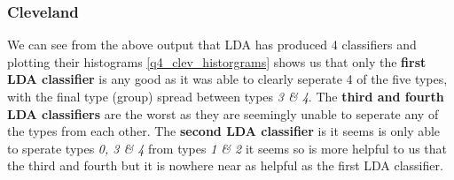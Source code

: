 \documentclass[a4paper]{article}
\begin{document}
\subsubsection{Cleveland}



We can see from the above output that LDA has produced 4 classifiers and
plotting their histograms \ref{q4_clev_historgrams} shows us that only the
\textbf{first LDA classifier} is any good as it was able to clearly seperate 4
of the five types, with the final type (group) spread between types \textit{3 \&
4}. The \textbf{third and fourth LDA classifiers} are the worst as they are
seemingly unable to seperate any of the types from each other. The
\textbf{second LDA classifier} is it seems is only able to sperate types
\textit{0, 3 \& 4} from types \textit{1 \& 2} it seems so is more helpful to us
that the third and fourth but it is nowhere near as helpful as the first LDA
classifier.
\end{document}
